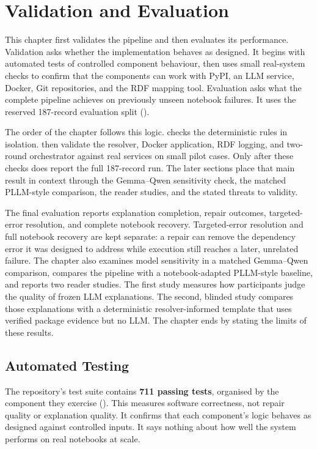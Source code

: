 \chapter{Validation and Evaluation}
\label{chap:validation}

This chapter first validates the pipeline and then evaluates its performance.
Validation asks whether the implementation behaves as designed. It begins with
automated tests of controlled component behaviour, then uses small real-system
checks to confirm that the components can work with PyPI, an LLM service,
Docker, Git repositories, and the RDF mapping tool. Evaluation asks what the
complete pipeline achieves on previously unseen notebook failures. It uses the
reserved 187-record evaluation split ().

The order of the chapter follows this logic.  checks the
deterministic rules in isolation. 
then validate the resolver, Docker application, RDF logging, and two-round
orchestrator against real services on small pilot cases. Only after these
checks does  report the full 187-record run. The later
sections place that main result in context through the Gemma--Qwen sensitivity
check, the matched PLLM-style comparison, the reader studies, and the stated
threats to validity.

The final evaluation reports explanation completion, repair outcomes,
targeted-error resolution, and complete notebook recovery. Targeted-error
resolution and full notebook recovery are kept separate: a repair can remove
the dependency error it was designed to address while execution still reaches
a later, unrelated failure. The chapter also examines model sensitivity in a
matched Gemma--Qwen comparison, compares the pipeline with a
notebook-adapted PLLM-style baseline, and reports two reader studies. The
first study measures how participants judge the quality of frozen LLM
explanations. The second, blinded study compares those explanations with a
deterministic resolver-informed template that uses verified package evidence
but no LLM. The chapter ends by stating the limits of these results.

\iffalse
\section{Automated Testing}
\label{sec:v-testing}

The repository's test suite contains \textbf{711 passing tests}, organised
by the component they exercise (). This measures software
correctness, not repair quality or explanation quality. It confirms that
each component's logic behaves as designed against controlled inputs. It
says nothing about how well the system performs on real notebooks at
scale.

